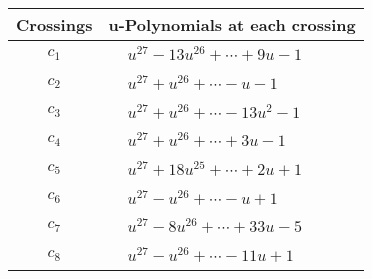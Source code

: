 \documentclass[1p]{elsarticle_modified}
\theoremstyle{definition}
\begin{document}
\begin{tabular}{m{50pt}|m{274pt}}
Crossings & \hspace{64pt}u-Polynomials at each crossing \\
\hline $$\begin{aligned}c_{1}\end{aligned}$$&$\begin{aligned}
&u^{27}-13 u^{26}+\cdots+9 u-1
\end{aligned}$\\
\hline $$\begin{aligned}c_{2}\end{aligned}$$&$\begin{aligned}
&u^{27}+u^{26}+\cdots- u-1
\end{aligned}$\\
\hline $$\begin{aligned}c_{3}\end{aligned}$$&$\begin{aligned}
&u^{27}+u^{26}+\cdots-13 u^2-1
\end{aligned}$\\
\hline $$\begin{aligned}c_{4}\end{aligned}$$&$\begin{aligned}
&u^{27}+u^{26}+\cdots+3 u-1
\end{aligned}$\\
\hline $$\begin{aligned}c_{5}\end{aligned}$$&$\begin{aligned}
&u^{27}+18 u^{25}+\cdots+2 u+1
\end{aligned}$\\
\hline $$\begin{aligned}c_{6}\end{aligned}$$&$\begin{aligned}
&u^{27}- u^{26}+\cdots- u+1
\end{aligned}$\\
\hline $$\begin{aligned}c_{7}\end{aligned}$$&$\begin{aligned}
&u^{27}-8 u^{26}+\cdots+33 u-5
\end{aligned}$\\
\hline $$\begin{aligned}c_{8}\end{aligned}$$&$\begin{aligned}
&u^{27}- u^{26}+\cdots-11 u+1
\end{aligned}$\\

\end{tabular}
\end{document}
